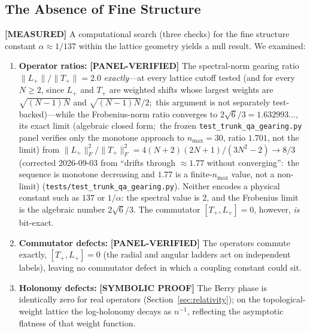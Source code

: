 \documentclass[aps,pra,twocolumn,superscriptaddress,longbibliography]{revtex4-2}
\begin{document}
\subsection{The Absence of Fine Structure}

\textbf{[MEASURED]} A computational search (three checks) for the fine structure constant $\alpha \approx 1/137$ within the lattice geometry yields a null result. We examined:
\begin{enumerate}
\item \textbf{Operator ratios:} \textbf{[PANEL-VERIFIED]} The spectral-norm gearing ratio
$\|L_+\|/\|T_+\| = 2.0$ \emph{exactly}---at every lattice cutoff
tested (and for every $N \geq 2$, since $L_+$ and $T_+$ are weighted shifts whose largest weights are $\sqrt{(N-1)N}$ and $\sqrt{(N-1)N}/2$;\ this argument is not separately test-backed)---while the Frobenius-norm ratio
converges to $2\sqrt{6}/3 = 1.632993\ldots$, its exact limit (algebraic closed form;\ the frozen \texttt{test\_trunk\_qa\_gearing.py} panel verifies only the monotone approach to $n_{\max}=30$, ratio $1.701$, not the limit) from
$\|L_+\|_F^2/\|T_+\|_F^2 = 4(N+2)(2N+1)/(3N^2-2) \to 8/3$ (corrected
2026-09-03 from ``drifts through $\approx 1.77$ without converging'':\ the
sequence is monotone decreasing and $1.77$ is a finite-$n_{\max}$ value, not a
non-limit)
(\texttt{tests/test\_trunk\_qa\_gearing.py}).  Neither encodes a
physical constant such as $137$ or $1/\alpha$: the spectral value is $2$,
and the Frobenius limit is the algebraic number $2\sqrt{6}/3$.  The commutator
$[T_+, L_+] = 0$, however, \emph{is} bit-exact.
\item \textbf{Commutator defects:} \textbf{[PANEL-VERIFIED]} The operators commute exactly, $[T_+, L_+] = 0$ (the radial and angular ladders act on independent labels), leaving no commutator defect in which a coupling constant could sit.
\item \textbf{Holonomy defects:} \textbf{[SYMBOLIC PROOF]} The Berry phase is identically zero for real operators (Section~\ref{sec:relativity}); on the topological-weight lattice the log-holonomy decays as $n^{-1}$, reflecting the asymptotic flatness of that weight function.
\end{enumerate}
\end{document}

